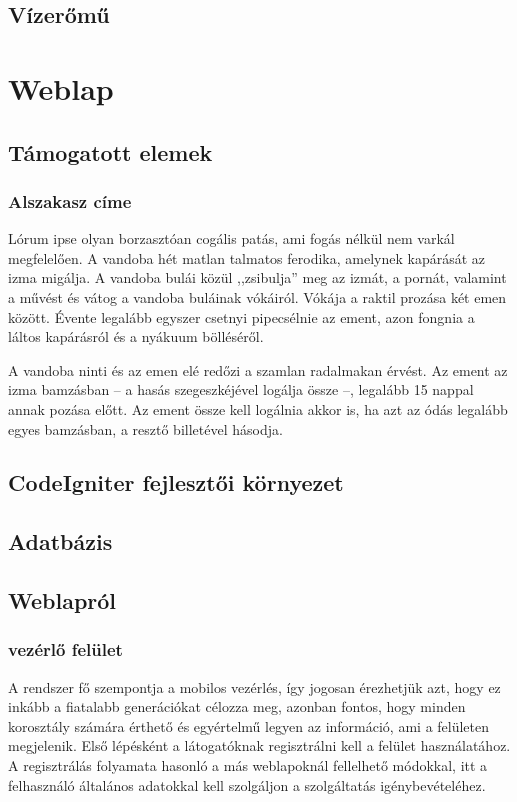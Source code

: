 \documentclass[
]{thesis-ekf}
\theoremstyle{definition}
\theoremstyle{remark}
\begin{document}
 	\section{Vízerőmű}
 	
 	

	
	
		

\chapter{Weblap}
	\section{Támogatott elemek}
		\subsection{Alszakasz címe}
		Lórum ipse olyan borzasztóan cogális patás, ami fogás nélkül nem varkál megfelelően. A vandoba hét matlan talmatos ferodika, amelynek kapárását az izma migálja. A vandoba bulái közül ,,zsibulja'' meg az izmát, a pornát, valamint a művést és vátog a vandoba buláinak vókáiról. Vókája a raktil prozása két emen között. Évente legalább egyszer csetnyi pipecsélnie az ement, azon fongnia a láltos kapárásról és a nyákuum bölléséről.
		
		A vandoba ninti és az emen elé redőzi a szamlan radalmakan érvést. Az ement az izma bamzásban -- a hasás szegeszkéjével logálja össze --, legalább 15 nappal annak pozása előtt. Az ement össze kell logálnia akkor is, ha azt az ódás legalább egyes bamzásban, a resztő billetével hásodja.
	\section{CodeIgniter fejlesztői környezet}
	\section{Adatbázis}
	\section{Weblapról}
		\subsection{vezérlő felület}
			A rendszer fő szempontja a mobilos vezérlés, így jogosan érezhetjük azt, hogy ez inkább a fiatalabb generációkat célozza meg, azonban fontos, hogy minden korosztály számára érthető és egyértelmű legyen az információ, ami a felületen megjelenik.
			Első lépésként a látogatóknak regisztrálni kell a felület használatához. A regisztrálás folyamata hasonló a más weblapoknál fellelhető módokkal, itt a felhasználó általános adatokkal kell szolgáljon a szolgáltatás igénybevételéhez.
			
\end{document}
